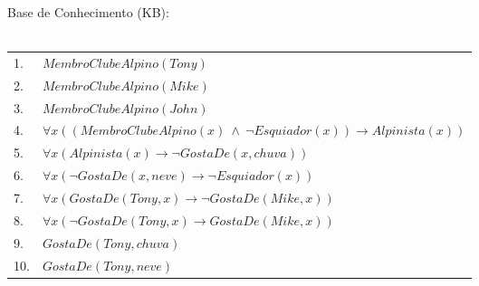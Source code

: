 \documentclass[12pt]{article}
\begin{document}
\begin{itemize}
\begin{itemize}
					\begin{center}
						Base de Conhecimento (KB):\\ \hfill \\
						\begin{tabular}{l|l}
							1. & $MembroClubeAlpino(Tony)$\\
							2. & $MembroClubeAlpino(Mike)$\\
							3. & $MembroClubeAlpino(John)$\\
							4. & $\forall x ((MembroClubeAlpino(x) \ \wedge \ \neg Esquiador(x)) 
							\rightarrow Alpinista(x)) $ \\
							5. & $\forall x (Alpinista(x) \rightarrow \neg GostaDe(x, chuva)) $\\
							6. & $\forall x (\neg GostaDe(x, neve) \rightarrow \neg Esquiador(x))$\\
							7. & $\forall x (GostaDe(Tony, x) \rightarrow \neg GostaDe(Mike, x))$\\
							8. & $\forall x (\neg GostaDe(Tony, x) \rightarrow GostaDe(Mike, x))$\\
							9. & $GostaDe(Tony, chuva)$\\
							10. & $GostaDe(Tony, neve)$\\			
						\end{tabular}
					\end{center}
			\end{itemize}
	\end{itemize}
\end{document}
